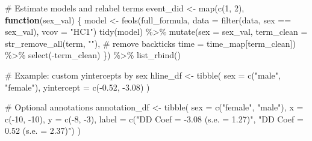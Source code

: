 \documentclass[
  letterpaper,
  DIV=11,
  numbers=noendperiod]{scrartcl}
\newenvironment{Shaded}{\begin{snugshade}}{\end{snugshade}}
\newcommand{\AttributeTok}[1]{\textcolor[rgb]{0.40,0.45,0.13}{#1}}
\newcommand{\CommentTok}[1]{\textcolor[rgb]{0.37,0.37,0.37}{#1}}
\newcommand{\ControlFlowTok}[1]{\textcolor[rgb]{0.00,0.23,0.31}{\textbf{#1}}}
\newcommand{\DecValTok}[1]{\textcolor[rgb]{0.68,0.00,0.00}{#1}}
\newcommand{\FloatTok}[1]{\textcolor[rgb]{0.68,0.00,0.00}{#1}}
\newcommand{\FunctionTok}[1]{\textcolor[rgb]{0.28,0.35,0.67}{#1}}
\newcommand{\NormalTok}[1]{\textcolor[rgb]{0.00,0.23,0.31}{#1}}
\newcommand{\OtherTok}[1]{\textcolor[rgb]{0.00,0.23,0.31}{#1}}
\newcommand{\SpecialCharTok}[1]{\textcolor[rgb]{0.37,0.37,0.37}{#1}}
\newcommand{\StringTok}[1]{\textcolor[rgb]{0.13,0.47,0.30}{#1}}
\begin{document}
\begin{Shaded}
\begin{Highlighting}[]
\CommentTok{\# Estimate models and relabel terms}
\NormalTok{event\_did }\OtherTok{\textless{}{-}} \FunctionTok{map}\NormalTok{(}\FunctionTok{c}\NormalTok{(}\DecValTok{1}\NormalTok{, }\DecValTok{2}\NormalTok{), }\ControlFlowTok{function}\NormalTok{(sex\_val) \{}
\NormalTok{  model }\OtherTok{\textless{}{-}} \FunctionTok{feols}\NormalTok{(full\_formula,}
                 \AttributeTok{data =} \FunctionTok{filter}\NormalTok{(data, sex }\SpecialCharTok{==}\NormalTok{ sex\_val),}
                 \AttributeTok{vcov =} \StringTok{"HC1"}\NormalTok{)}
  \FunctionTok{tidy}\NormalTok{(model) }\SpecialCharTok{\%\textgreater{}\%}
    \FunctionTok{mutate}\NormalTok{(}\AttributeTok{sex =}\NormalTok{ sex\_val,}
           \AttributeTok{term\_clean =} \FunctionTok{str\_remove\_all}\NormalTok{(term, }\StringTok{"\textasciigrave{}"}\NormalTok{),  }\CommentTok{\# remove backticks}
           \AttributeTok{time =}\NormalTok{ time\_map[term\_clean]) }\SpecialCharTok{\%\textgreater{}\%}
    \FunctionTok{select}\NormalTok{(}\SpecialCharTok{{-}}\NormalTok{term\_clean)}
\NormalTok{\}) }\SpecialCharTok{\%\textgreater{}\%} \FunctionTok{list\_rbind}\NormalTok{()}

\CommentTok{\# Example: custom yintercepts by sex}
\NormalTok{hline\_df }\OtherTok{\textless{}{-}} \FunctionTok{tibble}\NormalTok{(}
  \AttributeTok{sex =} \FunctionTok{c}\NormalTok{(}\StringTok{"male"}\NormalTok{, }\StringTok{"female"}\NormalTok{),}
  \AttributeTok{yintercept =} \FunctionTok{c}\NormalTok{(}\SpecialCharTok{{-}}\FloatTok{0.52}\NormalTok{, }\SpecialCharTok{{-}}\FloatTok{3.08}\NormalTok{)}
\NormalTok{)}

\CommentTok{\# Optional annotations}
\NormalTok{annotation\_df }\OtherTok{\textless{}{-}} \FunctionTok{tibble}\NormalTok{(}
  \AttributeTok{sex =} \FunctionTok{c}\NormalTok{(}\StringTok{"female"}\NormalTok{, }\StringTok{"male"}\NormalTok{),}
  \AttributeTok{x =} \FunctionTok{c}\NormalTok{(}\SpecialCharTok{{-}}\DecValTok{10}\NormalTok{, }\SpecialCharTok{{-}}\DecValTok{10}\NormalTok{),}
  \AttributeTok{y =} \FunctionTok{c}\NormalTok{(}\SpecialCharTok{{-}}\DecValTok{8}\NormalTok{, }\SpecialCharTok{{-}}\DecValTok{3}\NormalTok{),}
  \AttributeTok{label =} \FunctionTok{c}\NormalTok{(}\StringTok{"DD Coef = {-}3.08 (s.e. = 1.27)"}\NormalTok{, }\StringTok{"DD Coef = 0.52 (s.e. = 2.37)"}\NormalTok{)}
\NormalTok{)}



\end{Highlighting}
\end{Shaded}
\end{document}
